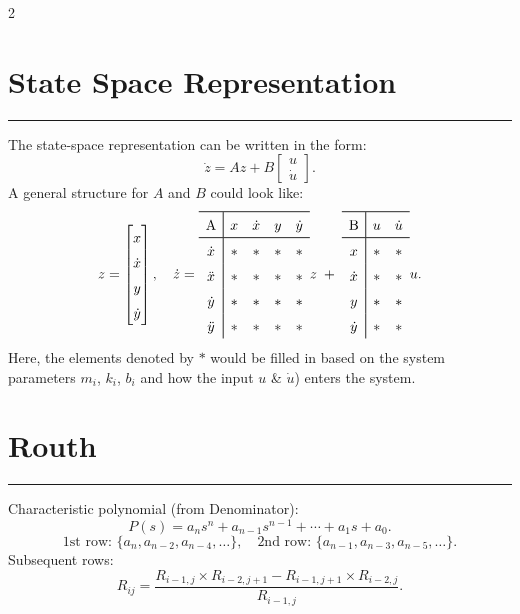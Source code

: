 \documentclass[letterpaper,10pt]{article}
\let\oldsection\section
\renewcommand{\section}[1]{%
\vspace{-1em}
  \oldsection{#1}%
  \par\vspace{-2em}%
  \noindent\rule{0.5\textwidth}{0.5pt}%
  \vspace{0em}%
}
\begin{document}
\begin{multicols}{2}
\section{State Space Representation}
The state-space representation can be written in the form:
\[
\dot{z} = A z + B \begin{bmatrix} u \\ \dot{u} \end{bmatrix}.
\]
A general structure for $A$ and $B$ could look like:
\[
z = \begin{bmatrix} x \\ \dot{x} \\ y \\ \dot{y} \end{bmatrix}, \quad
\dot{z} =
\setlength{\arrayrulewidth}{0.6pt}
\renewcommand{\arraystretch}{1.5}
\begin{array}{c|cccc}
    \hline
    \text{A} & x & \dot{x} & y & \dot{y} \\ \hline
    \dot{x}      & * & *       & * & *       \\
    \ddot{x}     & * & *       & * & *       \\
    \dot{y}      & * & *       & * & *       \\
    \ddot{y}     & * & *       & * & *       \\
\end{array} z
\;+\; 
\setlength{\arrayrulewidth}{0.6pt}
\renewcommand{\arraystretch}{1.5}
\begin{array}{c|cc}
    \hline
    \text{B} & u & \dot{u} \\ \hline
    x            & * & *       \\
    \dot{x}      & * & *       \\
    y            & * & *       \\
    \dot{y}      & * & *       \\
\end{array} u.
\]
Here, the elements denoted by $*$ would be filled in based on the system parameters $m_i$, $k_i$, $b_i$ and how the input $u$ \& $\dot{u}$) enters the system.

\section{Routh}
\noindent Characteristic polynomial (from Denominator):
\[
P(s) = a_n s^n + a_{n-1} s^{n-1} + \cdots + a_1 s + a_0.
\]
\[
\text{1st row: } \{a_n, a_{n-2}, a_{n-4}, \dots\}, \quad
\text{2nd row: } \{a_{n-1}, a_{n-3}, a_{n-5}, \dots\}.
\]
Subsequent rows:
\[
R_{ij} = \frac{R_{i-1,j} \times R_{i-2,j+1} - R_{i-1,j+1} \times R_{i-2,j}}{R_{i-1,j}}.
\]


\end{multicols}
\end{document}
